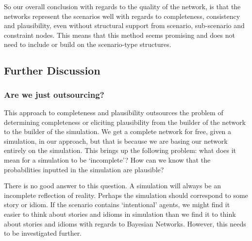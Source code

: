 So our overall conclusion with regards to the quality of the network, is that the networks represent the scenarios well with regards to completeness, consistency and plausibility, even without structural support from scenario, sub-scenario and constraint nodes. This means that this method seems promising and does not need to include or build on the scenario-type structures.

\subsection{Further Discussion}


\subsubsection{Are we just outsourcing?}

This approach to completeness and plausibility outsources the problem of determining completeness or eliciting plausibility from the builder of the network to the builder of the simulation. We get a complete network for free, given a simulation, in our approach, but that is because we are basing our network entirely on the simulation. This brings up the following problem: what does it mean for a simulation to be `incomplete'? How can we know that the probabilities inputted in the simulation are plausible?

 There is no good answer to this question. A simulation will always be an incomplete reflection of reality. Perhaps the simulation should correspond to some story or idiom. If the scenario contains `intentional' agents, we might find it easier to think about stories and idioms in simulation than we find it to think about stories and idioms with regards to Bayesian Networks. However, this needs to be investigated further.
 
